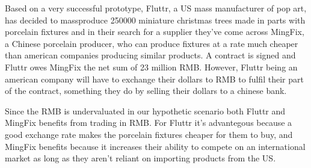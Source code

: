 Based on a very successful prototype, Fluttr, a US mass manufacturer of pop art,  has decided to massproduce 
250000 miniature christmas trees made in parts with porcelain fixtures 
and in their search for a supplier they've come across MingFix, a Chinese porcelain producer,  who can 
produce fixtures at a rate much cheaper than american companies 
producing similar products. A contract is signed and Fluttr owes 
MingFix the net sum of 23 million RMB. However, Fluttr being an american 
company will have to exchange their dollars to RMB to fulfil their part 
of the contract, something they do by selling their dollars to a chinese 
bank.


Since the RMB is undervaluated in our hypothetic scenario both Fluttr 
and MingFix benefits from trading in RMB. For Fluttr it's advantegous 
because a good exchange rate makes the porcelain fixtures cheaper for 
them to buy, and MingFix benefits because it increases their ability to 
compete on an international market as long as they aren't reliant on 
importing products from the US.


